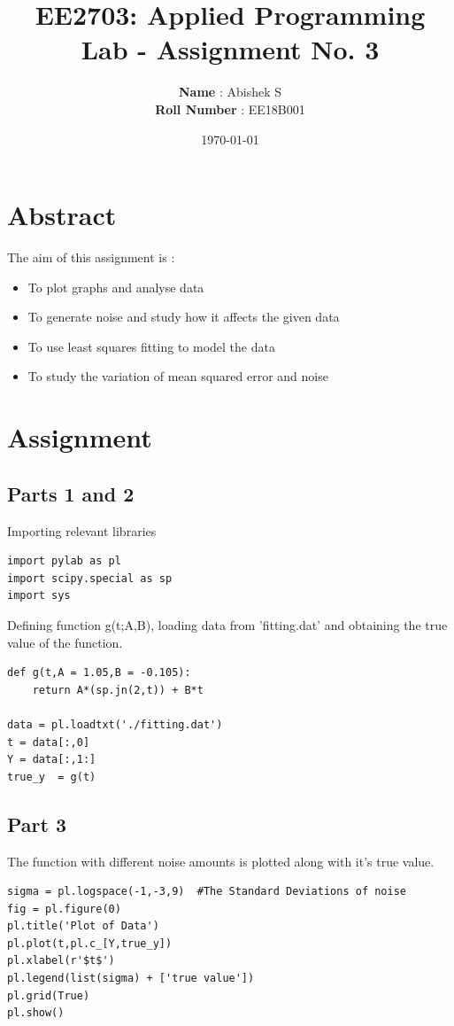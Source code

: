 \documentclass[11pt, a4paper]{article}
\title{\textbf{EE2703: Applied Programming Lab - Assignment No. 3}}
\author{
	\textbf{Name} : Abishek S \\
	\textbf{Roll Number} : EE18B001
}\date{\today}
\begin{document}
\maketitle
\section{Abstract}
The aim of this assignment is :
\begin{itemize}
\item To plot graphs and analyse data
\item To generate noise and study how it affects the given data
\item To use least squares fitting to model the data
\item To study the variation of mean squared error and noise
\end{itemize}

\section{Assignment}
\subsection{Parts 1 and 2}
Importing relevant libraries
\begin{verbatim}
import pylab as pl
import scipy.special as sp
import sys
\end{verbatim}
\hypertarget{g}{
Defining function g(t;A,B),  loading data from 'fitting.dat' and obtaining the true value of the function.}
\begin{verbatim}
def g(t,A = 1.05,B = -0.105):
	return A*(sp.jn(2,t)) + B*t

data = pl.loadtxt('./fitting.dat')
t = data[:,0]
Y = data[:,1:]
true_y  = g(t)
\end{verbatim}

\subsection{Part 3}
The function with different noise amounts is plotted along with it's true value.
\begin{verbatim}
sigma = pl.logspace(-1,-3,9)  #The Standard Deviations of noise
fig = pl.figure(0)
pl.title('Plot of Data')
pl.plot(t,pl.c_[Y,true_y])
pl.xlabel(r'$t$')
pl.legend(list(sigma) + ['true value'])
pl.grid(True)
pl.show()
\end{verbatim}
\end{document}
